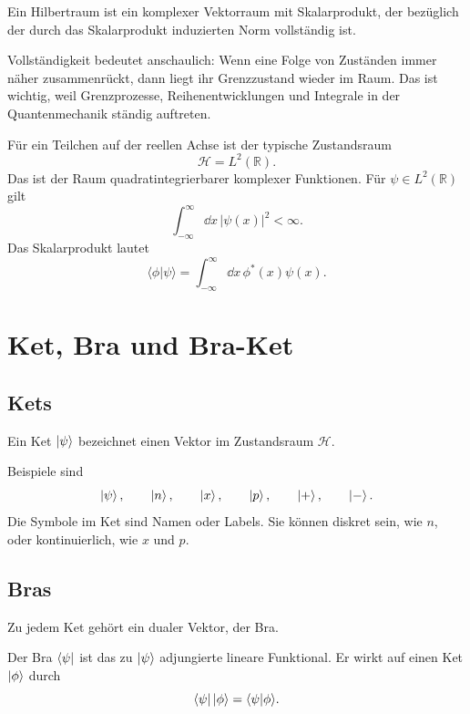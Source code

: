 \begin{definitionbox}
Ein Hilbertraum ist ein komplexer Vektorraum mit Skalarprodukt, der bezüglich der durch das Skalarprodukt induzierten Norm vollständig ist.
\end{definitionbox}

Vollständigkeit bedeutet anschaulich: Wenn eine Folge von Zuständen immer näher zusammenrückt, dann liegt ihr Grenzzustand wieder im Raum. Das ist wichtig, weil Grenzprozesse, Reihenentwicklungen und Integrale in der Quantenmechanik ständig auftreten.

\begin{examplebox}
Für ein Teilchen auf der reellen Achse ist der typische Zustandsraum
\[
    \mathcal H=L^2(\mathbb R).
\]
Das ist der Raum quadratintegrierbarer komplexer Funktionen. Für $\psi\in L^2(\mathbb R)$ gilt
\[
    \int_{-\infty}^{\infty}\dd x\, |\psi(x)|^2<\infty.
\]
Das Skalarprodukt lautet
\[
    \langle\phi|\psi\rangle
    =\int_{-\infty}^{\infty}\dd x\, \phi^*(x)\psi(x).
\]
\end{examplebox}

\section{Ket, Bra und Bra-Ket}

\subsection{Kets}

\begin{definitionbox}
Ein Ket $\left|\psi\right\rangle$ bezeichnet einen Vektor im Zustandsraum $\mathcal H$.
\end{definitionbox}

Beispiele sind
\[
    \left|\psi\right\rangle,\qquad \left|n\right\rangle,\qquad \left|x\right\rangle,\qquad \left|p\right\rangle,\qquad \left|+\right\rangle,\qquad \left|-\right\rangle.
\]
Die Symbole im Ket sind Namen oder Labels. Sie können diskret sein, wie $n$, oder kontinuierlich, wie $x$ und $p$.

\subsection{Bras}

Zu jedem Ket gehört ein dualer Vektor, der Bra.

\begin{definitionbox}
Der Bra $\left\langle\psi\right|$ ist das zu $\left|\psi\right\rangle$ adjungierte lineare Funktional. Er wirkt auf einen Ket $\left|\phi\right\rangle$ durch
\[
    \left\langle\psi\right|\left|\phi\right\rangle=\langle\psi|\phi\rangle.
\]
\end{definitionbox}

